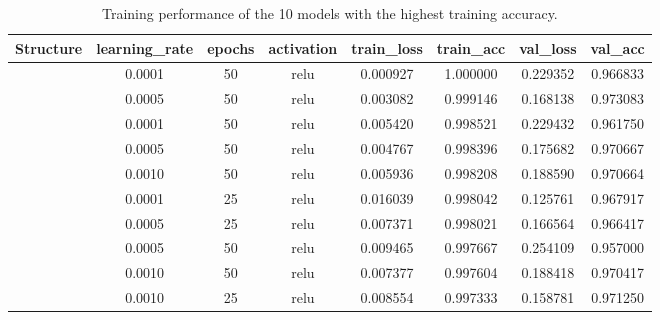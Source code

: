 \documentclass[a4paper]{article}
\begin{document}
\begin{table}[h!]
    \centering
    \caption{Training performance of the 10 models with the highest training accuracy.}
    \label{tab:ann_performance_top10_training_accuracy}
    \begin{tabular}{|| c c c c | c c c c ||}
  
    \hline
    \centering
    \textbf{Structure}  &\textbf{learning\_rate} &\textbf{epochs}    &\textbf{activation}    & \textbf{train\_loss}   &\textbf{train\_acc} &\textbf{val\_loss}  &\textbf{val\_acc} \\
    \hline \hline
    [64,32]             & 0.0001                & 50                & relu                  & 0.000927              & 1.000000          &0.229352           & 0.966833 \\ 
    \hline
    [64,32,16]          & 0.0005                & 50                & relu                  & 0.003082              & 0.999146          &0.168138           & 0.973083 \\ 
    \hline
    [64,32,16]          & 0.0001                & 50                & relu                  & 0.005420              & 0.998521          &0.229432           & 0.961750 \\ 
    \hline
    [64,32]             & 0.0005                & 50                & relu                  & 0.004767              & 0.998396          &0.175682           & 0.970667 \\ 
    \hline
    [64,32]             & 0.0010                & 50                & relu                  & 0.005936              & 0.998208          &0.188590           & 0.970664 \\ 
    \hline
    [64,32]             & 0.0001                & 25                & relu                  & 0.016039              & 0.998042          &0.125761           & 0.967917 \\ 
    \hline
    [64,32]             & 0.0005                & 25                & relu                  & 0.007371              & 0.998021          &0.166564           & 0.966417 \\ 
    \hline
    [32,16]             & 0.0005                & 50                & relu                  & 0.009465              & 0.997667          &0.254109           & 0.957000 \\ 
    \hline
    [64,32,16]          & 0.0010                & 50                & relu                  & 0.007377              & 0.997604          &0.188418           & 0.970417 \\ 
    \hline
    [64,32]             & 0.0010                & 25                & relu                  & 0.008554              & 0.997333          &0.158781           & 0.971250 \\ 
    \hline
    \end{tabular}
\end{table}
\end{document}
